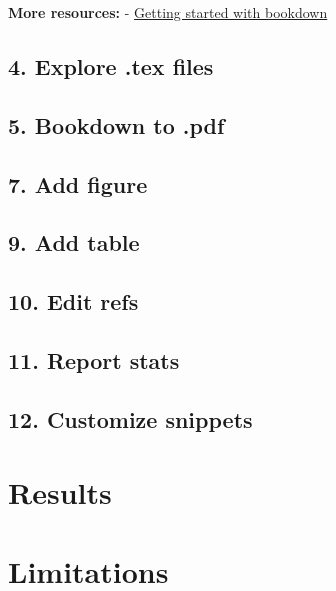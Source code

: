 \documentclass[
  12pt,
  oneside]{book}
\numberwithin{figure}{chapter}
\begin{document}
\textbf{More resources:}
- \href{https://bookdown.org/yihui/bookdown/get-started.html}{Getting started with bookdown}

\hypertarget{explore-.tex-files}{%
\section{4. Explore .tex files}\label{explore-.tex-files}}

\hypertarget{bookdown-to-.pdf}{%
\section{5. Bookdown to .pdf}\label{bookdown-to-.pdf}}

\hypertarget{add-figure}{%
\section{7. Add figure}\label{add-figure}}

\hypertarget{add-table}{%
\section{9. Add table}\label{add-table}}

\hypertarget{edit-refs}{%
\section{10. Edit refs}\label{edit-refs}}

\hypertarget{report-stats}{%
\section{11. Report stats}\label{report-stats}}

\hypertarget{customize-snippets}{%
\section{12. Customize snippets}\label{customize-snippets}}

\hypertarget{results}{%
\chapter{Results}\label{results}}

\hypertarget{limitations}{%
\chapter{Limitations}\label{limitations}}
\end{document}
